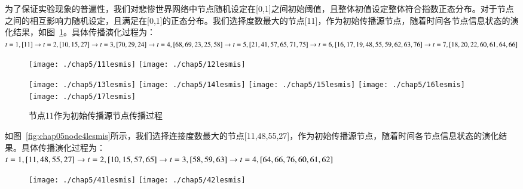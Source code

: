 为了保证实验现象的普遍性，我们对悲惨世界网络中节点随机设定在[0,1]之间初始阈值，且整体初值设定整体符合指数正态分布\cite{limpert2001log,holgate1989lognormal}。对于节点之间的相互影响力随机设定，且满足在[0,1]的正态分布\cite{lodzimierz1995normal,patel1996handbook,amari2007methods}。我们选择度数最大的节点[11]，作为初始传播源节点，随着时间各节点信息状态的演化结果，如图~\ref{fig:chap05node1lesmis}。具体传播演化过程为： \\
$  t=1,[11] \rightarrow t=2,[10, 15, 27] \rightarrow t=3,[70, 29, 24] \\ 
\rightarrow t=4,[68, 69, 23, 25, 58] \rightarrow t=5,[21, 41, 57, 65, 71, 75] \\ 
\rightarrow t=6,[16, 17, 19, 48, 55, 59, 62, 63, 76] \rightarrow t=7,[18, 20, 22, 60, 61, 64, 66]$

\begin{figure}[H]
	\centering%
	{\texttt{[image: ./chap5/11lesmis]}}
	{\texttt{[image: ./chap5/12lesmis]}}

\end{figure}
\addtocounter{figure}{-1}       %
\begin{figure}[H]
	\addtocounter{figure}{1}
	\centering%
	{\texttt{[image: ./chap5/13lesmis]}}
	{\texttt{[image: ./chap5/14lesmis]}}
	{\texttt{[image: ./chap5/15lesmis]}}
	{\texttt{[image: ./chap5/16lesmis]}}
	{\texttt{[image: ./chap5/17lesmis]}}
	\caption{节点11作为初始传播源节点传播过程}
	\label{fig:chap05node1lesmis}
\end{figure}
如图~\ref{fig:chap05node4lesmis}所示，我们选择连接度数最大的节点[11,48,55,27]，作为初始传播源节点，随着时间各节点信息状态的演化结果。具体传播演化过程为： \\
$  t=1,[11, 48, 55, 27] \rightarrow t=2,[10, 15, 57, 65] \\
\rightarrow t=3,[58, 59, 63] \rightarrow t=4,[64, 66, 76, 60, 61, 62] 
$
\begin{figure}[H]
	
	\centering%
	{\texttt{[image: ./chap5/41lesmis]}}
	{\texttt{[image: ./chap5/42lesmis]}}
\end{figure}
